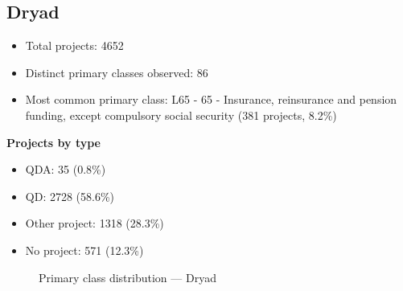 \subsection{Dryad}

\begin{itemize}
    \item Total projects: 4652
    \item Distinct primary classes observed: 86
    \item Most common primary class: L65 - 65 - Insurance, reinsurance and pension funding, except compulsory social security (381 projects, 8.2\%)
\end{itemize}
\textbf{Projects by type}
\begin{itemize}
    \item QDA: 35 (0.8\%)
    \item QD: 2728 (58.6\%)
    \item Other project: 1318 (28.3\%)
    \item No project: 571 (12.3\%)
\end{itemize}

\begin{figure}[H]
    \centering
    
    \caption{Primary class distribution --- Dryad}
\end{figure}

